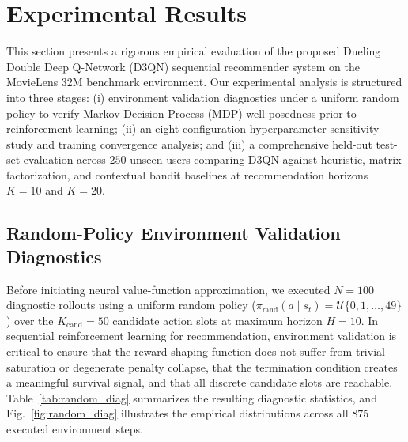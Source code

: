 \section{Experimental Results}
\label{sec:results}

This section presents a rigorous empirical evaluation of the proposed Dueling Double Deep Q-Network (D3QN) sequential recommender system on the MovieLens 32M benchmark environment. Our experimental analysis is structured into three stages: (i) environment validation diagnostics under a uniform random policy to verify Markov Decision Process (MDP) well-posedness prior to reinforcement learning; (ii) an eight-configuration hyperparameter sensitivity study and training convergence analysis; and (iii) a comprehensive held-out test-set evaluation across $250$ unseen users comparing D3QN against heuristic, matrix factorization, and contextual bandit baselines at recommendation horizons $K=10$ and $K=20$.

\subsection{Random-Policy Environment Validation Diagnostics}
\label{subsec:random_diag}

Before initiating neural value-function approximation, we executed $N = 100$ diagnostic rollouts using a uniform random policy ($\pi_{\text{rand}}(a \mid s_t) = \mathcal{U}\{0, 1, \dots, 49\}$) over the $K_{\text{cand}} = 50$ candidate action slots at maximum horizon $H = 10$. In sequential reinforcement learning for recommendation, environment validation is critical to ensure that the reward shaping function does not suffer from trivial saturation or degenerate penalty collapse, that the termination condition creates a meaningful survival signal, and that all discrete candidate slots are reachable. Table~\ref{tab:random_diag} summarizes the resulting diagnostic statistics, and Fig.~\ref{fig:random_diag} illustrates the empirical distributions across all $875$ executed environment steps.

